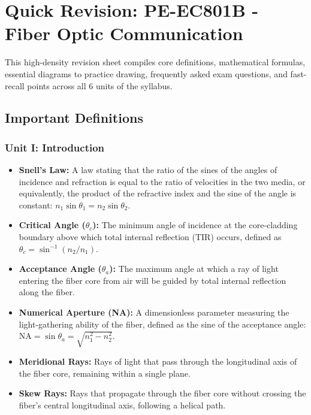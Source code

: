 \chapter{Quick Revision: PE-EC801B - Fiber Optic Communication}

This high-density revision sheet compiles core definitions, mathematical formulas, essential diagrams to practice drawing, frequently asked exam questions, and fast-recall points across all 6 units of the syllabus.


\section{Important Definitions}

\subsection{Unit I: Introduction}
\begin{itemize}
  \item   \textbf{Snell's Law:} A law stating that the ratio of the sines of the angles of incidence and refraction is equal to the ratio of velocities in the two media, or equivalently, the product of the refractive index and the sine of the angle is constant: $n_1 \sin \theta_1 = n_2 \sin \theta_2$.
  \item   \textbf{Critical Angle ($\theta_c$):} The minimum angle of incidence at the core-cladding boundary above which total internal reflection (TIR) occurs, defined as $\theta_c = \sin^{-1}(n_2/n_1)$.
  \item   \textbf{Acceptance Angle ($\theta_a$):} The maximum angle at which a ray of light entering the fiber core from air will be guided by total internal reflection along the fiber.
  \item   \textbf{Numerical Aperture (NA):} A dimensionless parameter measuring the light-gathering ability of the fiber, defined as the sine of the acceptance angle: $\text{NA} = \sin \theta_a = \sqrt{n_1^2 - n_2^2}$.
  \item   \textbf{Meridional Rays:} Rays of light that pass through the longitudinal axis of the fiber core, remaining within a single plane.
  \item   \textbf{Skew Rays:} Rays that propagate through the fiber core without crossing the fiber's central longitudinal axis, following a helical path.
\end{itemize}

